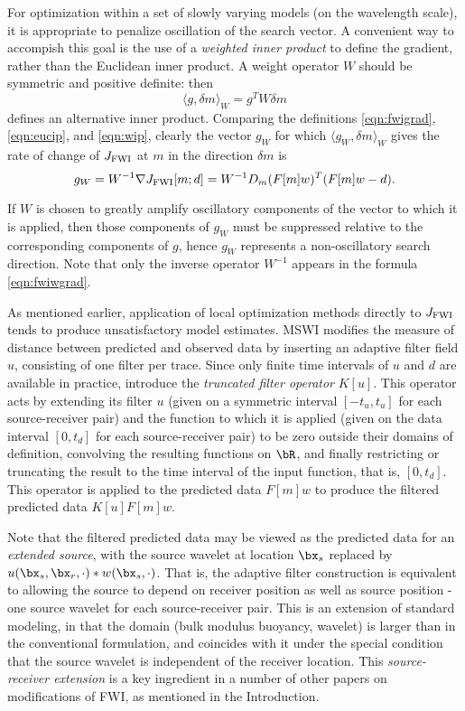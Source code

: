 For optimization within a set of slowly varying models (on the
wavelength scale),  it is appropriate to penalize oscillation of the
search vector. A convenient way to accompish this goal is the use of a
{\em weighted inner product} to define the gradient, rather than the
Euclidean inner product. A weight operator $W$ should be symmetric and
positive definite: then
\begin{equation}
  \label{eqn:wip}
  \langle g, \delta m\rangle_W = g^TW\delta m
\end{equation}
defines an alternative inner product. Comparing the definitions
\ref{eqn:fwigrad}, \ref{eqn:eucip}, and \ref{eqn:wip}, clearly the
vector $g_W$ for which $\langle g_W, \delta m \rangle_W$ gives the
rate of change of $J_{\rm FWI}$ at $m$ in the direction $\delta m$ is
\begin{equation}
  \label{eqn:fwiwgrad}
  g_W = W^{-1}\nabla  J_{\rm FWI}[m;d] =W^{-1} D_m(F[m]w)^T(F[m]w-d).
\end{equation}

If $W$ is chosen to greatly
amplify oscillatory components of the vector to which it is applied,
then those components of $g_W$ must be suppressed relative to the
corresponding components of $g$, hence $g_W$ represents a
non-oscillatory search direction. Note that only the inverse operator
$W^{-1}$ appears in the formula \ref{eqn:fwiwgrad}.

As mentioned earlier, application of local optimization methods
directly to $J_{\rm FWI}$ tends to produce unsatisfactory model
estimates. MSWI modifies the measure of distance between predicted and
observed data by inserting an adaptive filter field $u$, consisting of
one filter per trace. Since only finite time intervals of $u$ and $d$ are available in
practice, introduce the {\em truncated filter operator} $K[u]$. This
operator acts by extending its filter $u$ (given on a symmetric
interval $[-t_u,t_u]$ for each source-receiver pair) and the function to which
it is applied (given on the data interval $[0,t_d]$ for each
source-receiver pair) to be zero outside their domains of definition, convolving the
resulting functions on $\bR$, and finally restricting or truncating
the result to the time interval of the input function, that is,
$[0,t_d]$. This operator is applied to the predicted data $F[m]w$ to
produce the filtered predicted data $K[u]F[m]w$.

Note that the filtered predicted data may be viewed as the predicted
data for an {\em extended source}, with the source wavelet at location
$\bx_s$ replaced by $u(\bx_s,\bx_r,\cdot) * w(\bx_s,\cdot)$. That is,
the adaptive filter construction is equivalent to allowing the source
to depend on receiver position as well as source position - one source
wavelet for each source-receiver pair. This is an extension of
standard modeling, in that the domain (bulk modulus buoyancy, wavelet)
is larger than in the conventional formulation, and coincides with it
under the special condition that the source wavelet is independent of
the receiver location. This  {\em
  source-receiver extension} \cite[]{HuangSymes2015SEG} is a key ingredient in a number of
other papers on modifications of FWI, as mentioned in the Introduction.

